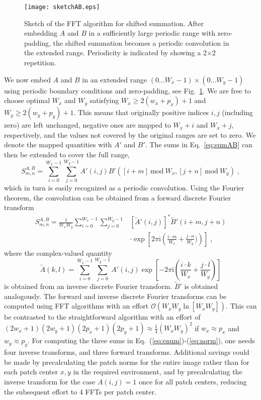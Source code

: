 \documentclass[twocolumn,amsmath, floatfix]{revtex4}
\begin{document}
\begin{figure}
\texttt{[image: sketchAB.eps]}
\caption{Sketch of the FFT algorithm for shifted summation. After embedding $A$ and $B$ in a sufficiently large periodic range with zero-padding,
the shifted summation becomes a periodic convolution in the extended range. Periodicity is indicated by showing a 2$\times$2 repetition. }
\label{fig:sketchAB}
\end{figure}

We now embed $A$ and $B$ in an extended range $(0 \dots W_x-1) \times (0 \dots W_y-1)$ 
using periodic boundary conditions and zero-padding, see Fig.~\ref{fig:sketchAB}. We are free to choose optimal $W_x$ and $W_y$ satisfying $W_x \ge 2(w_x + p_x) + 1$ and $W_y \ge 2(w_y + p_y)+1$. 
This means that originally positive indices $i,j$ (including zero) are left unchanged,
negative ones are mapped to $W_x + i$ and $W_x + j$, respectively, and the values not covered
by the original ranges are set to zero.
We denote the mapped quantities with $A'$ and $B'$.
The sums in Eq.~\ref{eq:sumAB} can then be extended to cover the full range,
\begin{equation}
S^{A,B}_{m,n} = \sum_{i=0}^{W_x-1}\sum_{j=0}^{W_y-1} A'(i,j) B'([i+m]~\textrm{mod}~W_x,[j+n]~\textrm{mod}~W_y)
   \;,
\end{equation}
which in turn is easily recognized as a periodic convolution. Using the Fourier theorem, the convolution
can be obtained from a forward discrete Fourier transform
\begin{equation}
\begin{aligned}
S^{A,B}_{m,n} = \frac{1}{W_xW_y}\sum_{i=0}^{W_x-1}\sum_{j=0}^{W_y-1} & \left[\tilde A'(i,j)\right]^* \tilde B'(i+m,j+n)\\
                &\cdot \exp\left[2\pi \mathrm i \left(\frac{i\cdot m}{W_x} + \frac{j\cdot n}{W_y})\right)\right]
   \;,
\end{aligned}
\end{equation}
where the complex-valued quantity
\begin{equation}
\tilde A(k,l) = \sum_{i=0}^{W_x-1}\sum_{j=0}^{W_y-1} A'(i,j)
                \exp\left[-2\pi \mathrm i \left(\frac{i\cdot k}{W_x} + \frac{j\cdot l}{W_y}\right)\right]
\end{equation}
is obtained from an inverse discrete Fourier transform. $\tilde B'$ is obtained analogously.
The forward and inverse discrete Fourier transforms can be computed using FFT algorithms
with an effort $\mathcal O(W_xW_y \ln [W_xW_y])$. This can be contrasted to the
straightforward algorithm with an effort of $(2 w_x+1)(2w_y+1)(2p_x+1)(2p_y+1)\approx\frac 14 (W_xW_y)^2$
if $w_x\approx p_x$ and $w_y \approx p_y$. For computing the three sums in Eq.~(\ref{eq:enum})-(\ref{eq:norm}),
one needs four inverse transforms, and three forward transforms. Additional savings could be made by
precalculating the patch norms for the entire image rather than for each patch center $x,y$ in the required
environment, and by precalculating the inverse transform for the case $A(i,j)=1$ once for all patch centers,
reducing the subsequent effort to 4 FFTs per patch center.
\end{document}
